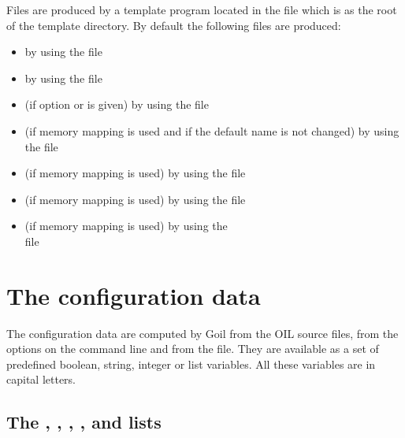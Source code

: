 Files are produced by a template program located in the  file which is as the root of the template directory. By default the following files are produced:
\begin{itemize}
\item {} by using the  file
\item {} by using the  file
\item {} (if option  or  is given) by using the  file
\item {} (if memory mapping is used and if the default name is not changed) by using the  file
\item {} (if memory mapping is used) by using the  file
\item {} (if memory mapping is used) by using the  file
\item {} (if memory mapping is used) by using the\\ file
\end{itemize}

\section{The configuration data}

The configuration data are computed by Goil from the OIL source files, from the options on the command line and from the  file. They are available as a set of predefined boolean, string, integer or list variables. All these variables are in capital letters.






\subsection{The , , , ,  and  lists}

